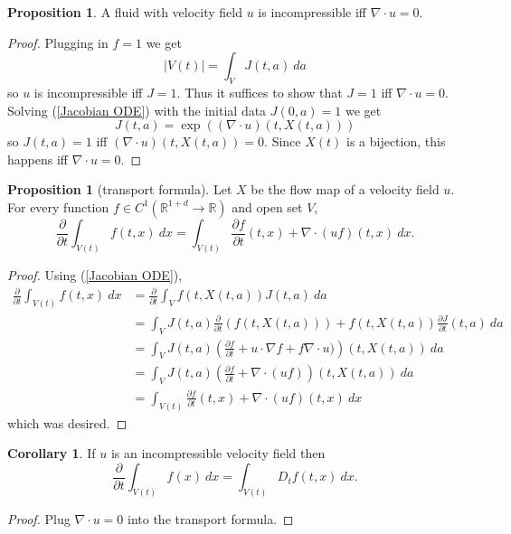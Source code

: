\documentclass[12pt]{book}
\newcommand{\RR}{\mathbb{R}}
\theoremstyle{definition}
\newtheorem{proposition}[theorem]{Proposition}
\newtheorem{corollary}[theorem]{Corollary}
\begin{document}
\begin{proposition}
A fluid with velocity field $u$ is incompressible iff $\nabla \cdot u = 0$.
\end{proposition}
\begin{proof}
Plugging in $f = 1$ we get
$$|V(t)| = \int_V J(t, a) ~da$$
so $u$ is incompressible iff $J = 1$. Thus it suffices to show that $J = 1$ iff $\nabla \cdot u = 0$.
Solving (\ref{Jacobian ODE}) with the initial data $J(0, a) = 1$ we get
$$J(t, a) = \exp((\nabla \cdot u)(t, X(t, a)))$$
so $J(t, a) = 1$ iff $(\nabla \cdot u)(t, X(t, a)) = 0$.
Since $X(t)$ is a bijection, this happens iff $\nabla \cdot u = 0$.
\end{proof}

\begin{proposition}[transport formula]
Let $X$ be the flow map of a velocity field $u$.
For every function $f \in C^1(\RR^{1+d} \to \RR)$ and open set $V$,
$$\frac{\partial}{\partial t} \int_{V(t)} f(t, x) ~dx = \int_{V(t)} \frac{\partial f}{\partial t}(t, x) + \nabla \cdot(uf)(t, x) ~dx.$$
\end{proposition}
\begin{proof}
Using (\ref{Jacobian ODE}),
\begin{align*}
\frac{\partial}{\partial t} \int_{V(t)} f(t, x) ~dx &= \frac{\partial}{\partial t} \int_V f(t, X(t, a)) J(t, a) ~da\\
&= \int_V J(t, a) \frac{\partial}{\partial t}(f(t, X(t, a))) + f(t, X(t, a)) \frac{\partial J}{\partial t}(t, a) ~da\\
&= \int_V J(t, a) \left(\frac{\partial f}{\partial t} + u \cdot \nabla f + f \nabla \cdot u)\right)(t, X(t, a)) ~da\\
&= \int_V J(t, a) \left(\frac{\partial f}{\partial t} + \nabla \cdot(uf)\right)(t, X(t, a)) ~da\\
&= \int_{V(t)} \frac{\partial f}{\partial t}(t, x) + \nabla \cdot(uf)(t, x) ~dx
\end{align*}
which was desired.
\end{proof}

\begin{corollary}
If $u$ is an incompressible velocity field then
$$\frac{\partial}{\partial t} \int_{V(t)} f(x) ~dx = \int_{V(t)} D_tf(t, x) ~dx.$$
\end{corollary}
\begin{proof}
Plug $\nabla \cdot u = 0$ into the transport formula.
\end{proof}
\end{document}
